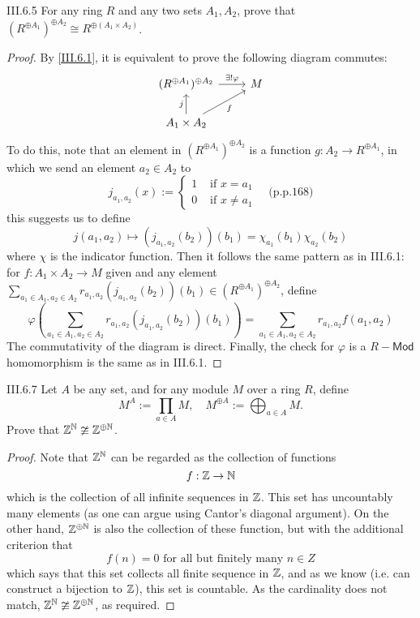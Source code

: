\begin{problem}{III.6.5}
For any ring $R$ and any two sets $A_1, A_2$, prove that $(R^{\oplus A_1})^{\oplus A_2} \cong R^{\oplus(A_1 \times A_2)}$.
\end{problem}
\begin{proof}
By \ref{III.6.1}, it is equivalent to prove the following diagram commutes:
\[
\begin{tikzcd}
(R^{\oplus A_1})^{\oplus A_2} \arrow[r, "\exists!\varphi"] & M \\
A_1 \times A_2 \arrow[ru, "f"'] \arrow[u, "j"]             &  
\end{tikzcd}
\]
To do this, note that an element in $(R^{\oplus A_1})^{\oplus A_2}$ is a function $g : A_2 \to R^{\oplus A_1}$, in which we send an element $a_2 \in A_2$ to 
\[
j_{a_1, a_2}(x) := \begin{cases}
1 &\text{ if } x = a_1 \\
0 &\text{ if } x \neq a_1 
\end{cases}	\quad \text{(p.p.168)}
\]
this suggests us to define
\[
j(a_1,a_2) \mapsto (j_{a_1,a_2}(b_2))(b_1) = \chi_{a_1}(b_1)\chi_{a_2}(b_2)	
\]
where $\chi$ is the indicator function. Then it follows the same pattern as in III.6.1: for $f : A_1 \times A_2 \to M$ given and any element $\sum_{a_1 \in A_1, a_2 \in A_2} r_{a_1,a_2} (j_{a_1,a_2}(b_2))(b_1) \in (R^{\oplus A_1})^{\oplus A_2}$, define
\[
\varphi \left(\sum_{a_1 \in A_1, a_2 \in A_2} r_{a_1,a_2} (j_{a_1,a_2}(b_2))(b_1)\right) = \sum_{a_1 \in A_1, a_2 \in A_2} r_{a_1,a_2} f(a_1,a_2)
\]
The commutativity of the diagram is direct. Finally, the check for $\varphi$ is a $R-\mathsf{Mod}$ homomorphism is the same as in III.6.1.
\end{proof}

\begin{problem}{III.6.7}
Let $A$ be any set, and for any module $M$ over a ring $R$, define 
\[
M^A	:= \prod_{a \in A}M, \quad M^{\oplus A} := \bigoplus_{a \in A}M.
\]
Prove that $\mathbb{Z}^{\mathbb{N}} \ncong \mathbb{Z}^{\oplus \mathbb{N}}$.
\end{problem}
\begin{proof}
Note that $\mathbb{Z}^{\mathbb{N}}$ can be regarded as the collection of functions
\[
f: \mathbb{Z} \to \mathbb{N} 
\]
which is the collection of all infinite sequences in $\mathbb{Z}$. This set has uncountably many elements (as one can argue using Cantor's diagonal argument). On the other hand, $\mathbb{Z}^{\oplus \mathbb{N}}$ is also the collection of these function, but with the additional criterion that
\[
f(n) = 0 \text{ for all but finitely many }	n \in Z
\]
which says that this set collects all finite sequence in $\mathbb{Z}$, and as we know (i.e. can construct a bijection to $\mathbb{Z}$), this set is countable. As the cardinality does not match, $\mathbb{Z}^{\mathbb{N}} \ncong \mathbb{Z}^{\oplus \mathbb{N}}$, as required.
\end{proof}

